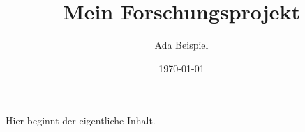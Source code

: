 \documentclass[a4paper,11pt]{article}
\title{Mein Forschungsprojekt}
\author{Ada Beispiel}
\date{\today}
\begin{document}
\maketitle
Hier beginnt der eigentliche Inhalt.
\end{document}
